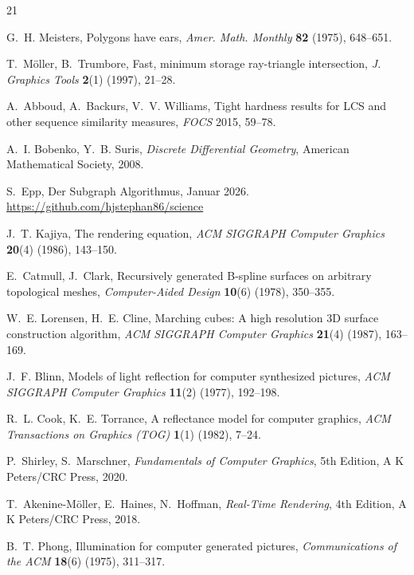 ﻿\documentclass[a4paper,12pt]{article}
\theoremstyle{definition}
\begin{document}
\begin{thebibliography}{21}
	
	G.~H. Meisters,
	Polygons have ears,
	\emph{Amer. Math. Monthly} \textbf{82} (1975), 648--651.
	
	T.~M\"oller, B.~Trumbore,
	Fast, minimum storage ray-triangle intersection,
	\emph{J. Graphics Tools} \textbf{2}(1) (1997), 21--28.
	
	A.~Abboud, A.~Backurs, V.~V. Williams,
	Tight hardness results for LCS and other sequence similarity measures,
	\emph{FOCS} 2015, 59--78.
	
	A.~I. Bobenko, Y.~B. Suris,
	\emph{Discrete Differential Geometry},
	American Mathematical Society, 2008.
	
	S.~Epp,
	Der Subgraph Algorithmus, Januar 2026.
	\url{https://github.com/hjstephan86/science}
	
	J.~T. Kajiya,
	The rendering equation,
	\emph{ACM SIGGRAPH Computer Graphics} \textbf{20}(4) (1986), 143--150.
	
	E.~Catmull, J.~Clark,
	Recursively generated B-spline surfaces on arbitrary topological meshes,
	\emph{Computer-Aided Design} \textbf{10}(6) (1978), 350--355.
	
	W.~E. Lorensen, H.~E. Cline,
	Marching cubes: A high resolution 3D surface construction algorithm,
	\emph{ACM SIGGRAPH Computer Graphics} \textbf{21}(4) (1987), 163--169.
	
	J.~F. Blinn,
	Models of light reflection for computer synthesized pictures,
	\emph{ACM SIGGRAPH Computer Graphics} \textbf{11}(2) (1977), 192--198.
	
	R.~L. Cook, K.~E. Torrance,
	A reflectance model for computer graphics,
	\emph{ACM Transactions on Graphics (TOG)} \textbf{1}(1) (1982), 7--24.
	
	P.~Shirley, S.~Marschner,
	\emph{Fundamentals of Computer Graphics},
	5th Edition, A K Peters/CRC Press, 2020.
	
	T.~Akenine-M\"oller, E.~Haines, N.~Hoffman,
	\emph{Real-Time Rendering},
	4th Edition, A K Peters/CRC Press, 2018.
	
	B.~T. Phong,
	Illumination for computer generated pictures,
	\emph{Communications of the ACM} \textbf{18}(6) (1975), 311--317.
	

\end{thebibliography}
\end{document}
